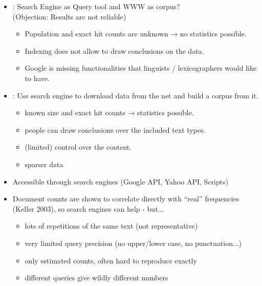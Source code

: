 \documentclass[a4paper,landscape,headrule,footrule,dvips]{foils}
\begin{document}
\begin{CJK}{UTF8}{min}
\begin{itemize}
\item {}: Search Engine as Query tool and WWW as corpus?
\\  (Objection: Results are not reliable)
\begin{itemize}
\item Population and exact hit counts are unknown → no statistics
possible.
\item Indexing does not allow to draw conclusions on the data.
\item[\Bad] Google is missing functionalities that linguists /
lexicographers would like to have.
\end{itemize}
\item {}: Use search engine to download data from the
net and build a corpus from it.
\begin{itemize}
\item known size and exact hit counts → statistics possible.
\item people can draw conclusions over the included text types.
\item (limited) control over the content.
\item[\Bad] sparser data
\end{itemize}
\end{itemize}

\begin{itemize}
\item Accessible through search engines (Google API, Yahoo API, Scripts)

\item Document counts are shown to correlate directly with ``real''
  frequencies (Keller 2003), so search engines can help - but...
  \begin{itemize}
  \item lots of repetitions of the same text (not representative)
  \item very limited query precision (no upper/lower case, no punctuation...)
  \item only estimated counts, often hard to reproduce exactly
  \item different queries give wildly different numbers
  \end{itemize}
\end{itemize}


\end{CJK}
\end{document}
